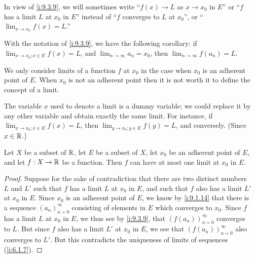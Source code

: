 \begin{note}
  In view of \cref{i:9.3.9}, we will sometimes write ``\(f(x) \to L\) as \(x \to x_0\) in \(E\)'' or ``\(f\) has a limit \(L\) at \(x_0\) in \(E\)'' instead of ``\(f\) converges to \(L\) at \(x_0\)'', or ``\(\lim_{x \to x_0} f(x) = L\).''
\end{note}

\begin{rmk}\label{i:9.3.10}
  With the notation of \cref{i:9.3.9}, we have the following corollary:
  if \(\lim_{x \to x_0 ; x \in E} f(x) = L\), and \(\lim_{n \to \infty} a_n = x_0\), then \(\lim_{n \to \infty} f(a_n) = L\).
\end{rmk}

\begin{rmk}\label{i:9.3.11}
  We only consider limits of a function \(f\) at \(x_0\) in the case when \(x_0\) is an adherent point of \(E\).
  When \(x_0\) is not an adherent point then it is not worth it to define the concept of a limit.
\end{rmk}

\begin{rmk}\label{i:9.3.12}
  The variable \(x\) used to denote a limit is a dummy variable;
  we could replace it by any other variable and obtain exactly the same limit.
  For instance, if \(\lim_{x \to x_0 ; x \in E} f(x) = L\), then \(\lim_{y \to x_0 ; y \in E} f(y) = L\), and conversely.
  (Since \(x \in \mathbb{R}\).)
\end{rmk}

\begin{cor}\label{i:9.3.13}
  Let \(X\) be a subset of \(\mathbb{R}\), let \(E\) be a subset of \(X\), let \(x_0\) be an adherent point of \(E\), and let \(f : X \to \mathbb{R}\) be a function.
  Then \(f\) can have at most one limit at \(x_0\) in \(E\).
\end{cor}

\begin{proof}
  Suppose for the sake of contradiction that there are two distinct numbers \(L\) and \(L'\) such that \(f\) has a limit \(L\) at \(x_0\) in \(E\), and such that \(f\) also has a limit \(L'\) at \(x_0\) in \(E\).
  Since \(x_0\) is an adherent point of \(E\), we know by \cref{i:9.1.14} that there is a sequence \((a_n)_{n = 0}^\infty\) consisting of elements in \(E\) which converges to \(x_0\).
  Since \(f\) has a limit \(L\) at \(x_0\) in \(E\), we thus see by \cref{i:9.3.9}, that \((f(a_n))_{n = 0}^\infty\) converges to \(L\).
  But since \(f\) also has a limit \(L'\) at \(x_0\) in \(E\), we see that \((f(a_n))_{n = 0}^\infty\) also converges to \(L'\).
  But this contradicts the uniqueness of limits of sequences (\cref{i:6.1.7}).
\end{proof}

